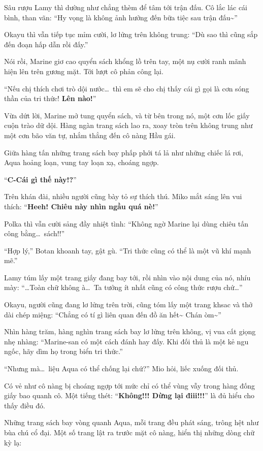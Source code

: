 \documentclass[../main.tex]{subfiles}
\begin{document}
Sâu rượu Lamy thì dường như chẳng thèm để tâm tới trận đấu. Cô lắc lác cái bình, than vãn: ``Hy vọng là không ảnh hưởng đến bữa tiệc sau trận đấu\~{}''

Okayu thì vẫn tiếp tục mỉm cười, lơ lửng trên không trung: ``Dù sao thì cũng sắp đến đoạn hấp dẫn rồi đấy.''

Nói rồi, Marine giơ cao quyển sách khổng lồ trên tay, một nụ cười ranh mãnh hiện lên trên gương mặt. Tới lượt cô phản công lại.

``Nếu chị thích chơi trò dội nước\dots\ thì em sẽ cho chị thấy cái gì gọi là cơn sóng thần của tri thức! \textbf{Lên nào!}''

Vừa dứt lời, Marine mở tung quyển sách, và từ bên trong nó, một cơn lốc giấy cuộn trào dữ dội. Hàng ngàn trang sách lao ra, xoay tròn trên không trung như một cơn bão văn tự, nhắm thẳng đến cô nàng Hầu gái.

Giữa hàng tấn những trang sách bay phấp phới tá lả như những chiếc lá rơi, Aqua hoảng loạn, vung tay loạn xạ, choáng ngợp.

``\textbf{C-Cái gì thế này!?}''

Trên khán đài, nhiều người cũng bày tỏ sự thích thú. Miko mắt sáng lên vui thích: ``\textbf{Heeh! Chiêu này nhìn ngầu quá nè!}''

Polka thì vẫn cười sảng đầy nhiệt tình: ``Không ngờ Marine lại dùng chiêu tấn công bằng\dots\ sách!!''

``Hợp lý,'' Botan khoanh tay, gật gù. ``Tri thức cũng có thể là một vũ khí mạnh mẽ.''

Lamy túm lấy một trang giấy đang bay tới, rồi nhìn vào nội dung của nó, nhíu mày: ``\dots Toàn chữ không à\dots\ Ta tưởng ít nhất cũng có công thức rượu chứ\dots''

Okayu, người cũng đang lơ lửng trên trời, cũng tóm lấy một trang khsac và thở dài chép miệng: ``Chẳng có tí gì liên quan đến đồ ăn hết\~{} Chán òm\~{}''

Nhìn hàng trăm, hàng nghìn trang sách bay lơ lửng trên không, vị vua cất giọng nhẹ nhàng: ``Marine-san có một cách đánh hay đấy. Khi đối thủ là một kẻ ngu ngốc, hãy dìm họ trong biển tri thức.''

``Nhưng mà\dots\ liệu Aqua có thể chống lại chứ?'' Mio hỏi, liếc xuống đối thủ.

Có vẻ như cô nàng bị choáng ngợp tới mức chỉ có thể vùng vẫy trong hàng đống giấy bao quanh cô. Một tiếng thét: ``\textbf{Không!!! Dừng lại điii!!!}'' là đủ hiểu cho thấy điều đó.

Những trang sách bay vòng quanh Aqua, mỗi trang đều phát sáng, trông hệt như bùa chú cổ đại. Một số trang lật ra trước mặt cô nàng, hiển thị những dòng chữ kỳ lạ:
\end{document}
